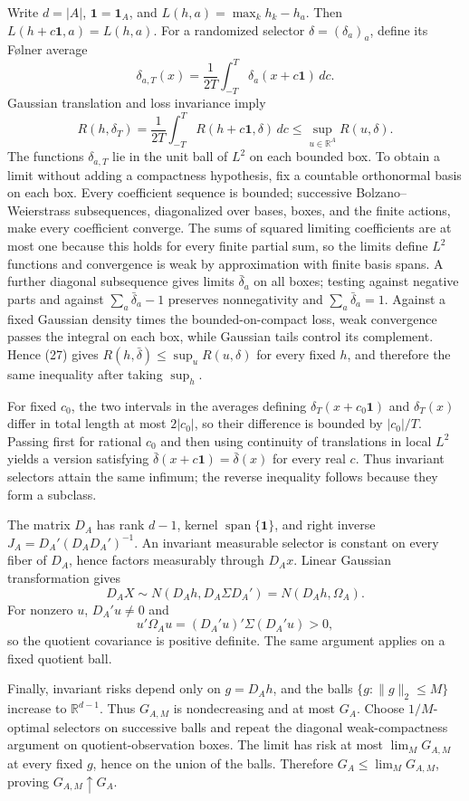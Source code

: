 Write \(d=|A|\), \(\mathbf1=\mathbf1_A\), and \(L(h,a)=\max_kh_k-h_a\).  Then \(L(h+c\mathbf1,a)=L(h,a)\).  For a randomized selector \(\delta=(\delta_a)_a\), define its F{\o}lner average
\[
 \delta_{a,T}(x)=\frac1{2T}\int_{-T}^T\delta_a(x+c\mathbf1)\,dc.
\]
Gaussian translation and loss invariance imply
\[
 R(h,\delta_T)=\frac1{2T}\int_{-T}^TR(h+c\mathbf1,\delta)\,dc
 \leq\sup_{u\in\mathbb R^A}R(u,\delta). \tag{27}
\]
The functions \(\delta_{a,T}\) lie in the unit ball of \(L^2\) on each bounded box.  To obtain a limit without adding a compactness hypothesis, fix a countable orthonormal basis on each box.  Every coefficient sequence is bounded; successive Bolzano--Weierstrass subsequences, diagonalized over bases, boxes, and the finite actions, make every coefficient converge.  The sums of squared limiting coefficients are at most one because this holds for every finite partial sum, so the limits define \(L^2\) functions and convergence is weak by approximation with finite basis spans.  A further diagonal subsequence gives limits \(\bar\delta_a\) on all boxes; testing against negative parts and against \(\sum_a\bar\delta_a-1\) preserves nonnegativity and \(\sum_a\bar\delta_a=1\).  Against a fixed Gaussian density times the bounded-on-compact loss, weak convergence passes the integral on each box, while Gaussian tails control its complement.  Hence (27) gives \(R(h,\bar\delta)\leq\sup_uR(u,\delta)\) for every fixed \(h\), and therefore the same inequality after taking \(\sup_h\).

For fixed \(c_0\), the two intervals in the averages defining \(\delta_T(x+c_0\mathbf1)\) and \(\delta_T(x)\) differ in total length at most \(2|c_0|\), so their difference is bounded by \(|c_0|/T\).  Passing first for rational \(c_0\) and then using continuity of translations in local \(L^2\) yields a version satisfying \(\bar\delta(x+c\mathbf1)=\bar\delta(x)\) for every real \(c\).  Thus invariant selectors attain the same infimum; the reverse inequality follows because they form a subclass.

The matrix \(D_A\) has rank \(d-1\), kernel \(\operatorname{span}\{\mathbf1\}\), and right inverse \(J_A=D_A'(D_AD_A')^{-1}\).  An invariant measurable selector is constant on every fiber of \(D_A\), hence factors measurably through \(D_Ax\).  Linear Gaussian transformation gives
\[
 D_AX\sim N(D_Ah,D_A\Sigma D_A')=N(D_Ah,\Omega_A).
\]
For nonzero \(u\), \(D_A'u\ne0\) and
\[
 u'\Omega_Au=(D_A'u)'\Sigma(D_A'u)>0, \tag{28}
\]
so the quotient covariance is positive definite.  The same argument applies on a fixed quotient ball.

Finally, invariant risks depend only on \(g=D_Ah\), and the balls \(\{g:\|g\|_2\leq M\}\) increase to \(\mathbb R^{d-1}\).  Thus \(G_{A,M}\) is nondecreasing and at most \(G_A\).  Choose \(1/M\)-optimal selectors on successive balls and repeat the diagonal weak-compactness argument on quotient-observation boxes.  The limit has risk at most \(\lim_MG_{A,M}\) at every fixed \(g\), hence on the union of the balls.  Therefore \(G_A\leq\lim_MG_{A,M}\), proving \(G_{A,M}\uparrow G_A\).